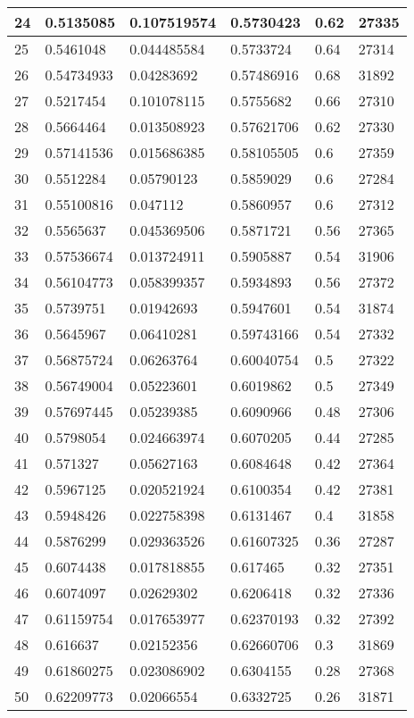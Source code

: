 \begin{longtable}{|l|l|l|l|l|l|}
24 & 0.5135085 & 0.107519574 & 0.5730423 & 0.62 & 27335 \\ \hline 
25 & 0.5461048 & 0.044485584 & 0.5733724 & 0.64 & 27314 \\ \hline 
26 & 0.54734933 & 0.04283692 & 0.57486916 & 0.68 & 31892 \\ \hline 
27 & 0.5217454 & 0.101078115 & 0.5755682 & 0.66 & 27310 \\ \hline 
28 & 0.5664464 & 0.013508923 & 0.57621706 & 0.62 & 27330 \\ \hline 
29 & 0.57141536 & 0.015686385 & 0.58105505 & 0.6 & 27359 \\ \hline 
30 & 0.5512284 & 0.05790123 & 0.5859029 & 0.6 & 27284 \\ \hline 
31 & 0.55100816 & 0.047112 & 0.5860957 & 0.6 & 27312 \\ \hline 
32 & 0.5565637 & 0.045369506 & 0.5871721 & 0.56 & 27365 \\ \hline 
33 & 0.57536674 & 0.013724911 & 0.5905887 & 0.54 & 31906 \\ \hline 
34 & 0.56104773 & 0.058399357 & 0.5934893 & 0.56 & 27372 \\ \hline 
35 & 0.5739751 & 0.01942693 & 0.5947601 & 0.54 & 31874 \\ \hline 
36 & 0.5645967 & 0.06410281 & 0.59743166 & 0.54 & 27332 \\ \hline 
37 & 0.56875724 & 0.06263764 & 0.60040754 & 0.5 & 27322 \\ \hline 
38 & 0.56749004 & 0.05223601 & 0.6019862 & 0.5 & 27349 \\ \hline 
39 & 0.57697445 & 0.05239385 & 0.6090966 & 0.48 & 27306 \\ \hline 
40 & 0.5798054 & 0.024663974 & 0.6070205 & 0.44 & 27285 \\ \hline 
41 & 0.571327 & 0.05627163 & 0.6084648 & 0.42 & 27364 \\ \hline 
42 & 0.5967125 & 0.020521924 & 0.6100354 & 0.42 & 27381 \\ \hline 
43 & 0.5948426 & 0.022758398 & 0.6131467 & 0.4 & 31858 \\ \hline 
44 & 0.5876299 & 0.029363526 & 0.61607325 & 0.36 & 27287 \\ \hline 
45 & 0.6074438 & 0.017818855 & 0.617465 & 0.32 & 27351 \\ \hline 
46 & 0.6074097 & 0.02629302 & 0.6206418 & 0.32 & 27336 \\ \hline 
47 & 0.61159754 & 0.017653977 & 0.62370193 & 0.32 & 27392 \\ \hline 
48 & 0.616637 & 0.02152356 & 0.62660706 & 0.3 & 31869 \\ \hline 
49 & 0.61860275 & 0.023086902 & 0.6304155 & 0.28 & 27368 \\ \hline 
50 & 0.62209773 & 0.02066554 & 0.6332725 & 0.26 & 31871 \\ \hline 
\end{longtable}